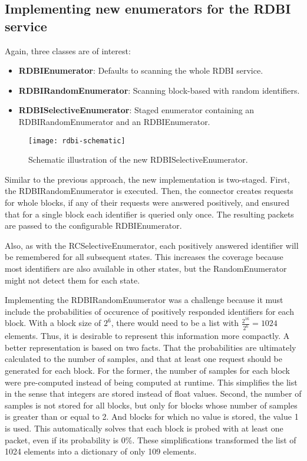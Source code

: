 \subsection{Implementing new enumerators for the RDBI service}

Again, three classes are of interest:

\begin{itemize}
    \item \textbf{RDBIEnumerator}: Defaults to scanning the whole RDBI service.
    \item \textbf{RDBIRandomEnumerator}: Scanning block-based with random identifiers.
    \item \textbf{RDBISelectiveEnumerator}: Staged enumerator containing an RDBIRandomEnumerator and an RDBIEnumerator.
\end{itemize}

\begin{figure}[h]
    \centering
    \texttt{[image: rdbi-schematic]}
    \caption{Schematic illustration of the new RDBISelectiveEnumerator.}
    \label{fig:rdbi-schematic}
\end{figure}

Similar to the previous approach, the new implementation is two-staged. First, the RDBIRandomEnumerator is executed. Then, the connector creates requests for whole blocks, if any of their requests were answered positively, and ensured that for a single block each identifier is queried only once. The resulting packets are passed to the configurable RDBIEnumerator.

Also, as with the RCSelectiveEnumerator, each positively answered identifier will be remembered for all subsequent states. This increases the coverage because most identifiers are also available in other states, but the RandomEnumerator might not detect them for each state.

Implementing the RDBIRandomEnumerator was a challenge because it must include the probabilities of occurence of positively responded identifiers for each block. With a block size of $2^6$, there would need to be a list with $\frac{2^{16}}{2^6} = 1024$ elements. Thus, it is desirable to represent this information more compactly. A better representation is based on two facts. That the probabilities are ultimately calculated to the number of samples, and that at least one request should be generated for each block. For the former, the number of samples for each block were pre-computed instead of being computed at runtime. This simplifies the list in the sense that integers are stored instead of float values. Second, the number of samples is not stored for all blocks, but only for blocks whose number of samples is greater than or equal to 2. And blocks for which no value is stored, the value 1 is used. This automatically solves that each block is probed with at least one packet, even if its probability is 0\%. These simplifications transformed the list of 1024 elements into a dictionary of only 109 elements.

